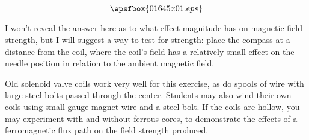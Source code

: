 

$$\epsfbox{01645x01.eps}$$

\vfil \eject






I won't reveal the answer here as to what effect magnitude has on magnetic field strength, but I will suggest a way to test for strength: place the compass at a distance from the coil, where the coil's field has a relatively small effect on the needle position in relation to the ambient magnetic field.







Old solenoid valve coils work very well for this exercise, as do spools of wire with large steel bolts passed through the center.  Students may also wind their own coils using small-gauge magnet wire and a steel bolt.  If the coils are hollow, you may experiment with and without ferrous cores, to demonstrate the effects of a ferromagnetic flux path on the field strength produced.




